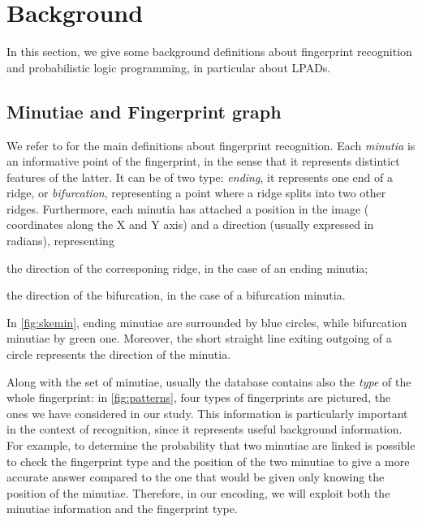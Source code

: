 \documentclass[8pt]{article}
\begin{document}
\section{Background}
\label{sec:background}
In this section, we give some background definitions about fingerprint
recognition and probabilistic logic programming, in particular about LPADs.

\subsection{Minutiae and Fingerprint graph}
\label{sub:backfinger}
We refer to \cite{maltoni2009handbook} for the main definitions about
fingerprint recognition.  Each \emph{minutia} is an informative point of the
fingerprint, in the sense that it represents distintict features of the latter.
It can be of two type: \emph{ending}, \ie it represents one end of a ridge, or
\emph{bifurcation}, representing a point where a ridge splits into two other
ridges.  Furthermore, each minutia has attached a position in the image (\ie
coordinates along the X and Y axis) and a direction (usually expressed in
radians), representing 
\begin{enumerate*}[label=\roman*)]
  \item the direction of the corresponing ridge, in the case of an ending
        minutia;
  \item the direction of the bifurcation, in the case of a bifurcation minutia.
\end{enumerate*}
In \cref{fig:skemin}, ending minutiae are surrounded by blue circles, while
bifurcation minutiae by green one. Moreover, the short straight line exiting
outgoing of a circle represents the direction of the minutia. 

Along with the set of minutiae, usually the database contains also the
\emph{type} of the whole fingerprint: in \cref{fig:patterns}, four types of
fingerprints are pictured, \ie the ones we have considered in our study. This
information is particularly important in the context of recognition, since it
represents useful background information.  For example, to determine the
probability that two minutiae are linked is possible to check the fingerprint
type and the position of the two minutiae to give a more accurate answer
compared to the one that would be given only knowing the position of the
minutiae.  Therefore, in our encoding, we will exploit both the minutiae
information and the fingerprint type. 
    
\end{document}
